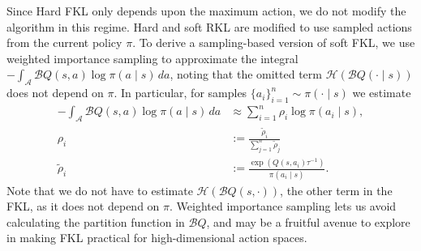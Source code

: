 \documentclass[twoside,11pt]{article}
\newcommand{\actionspace}{\mathcal{A}}
\newcommand{\boltzmannQ}{\mathcal{B}Q}
\newcommand{\entropy}{\mathcal{H}}
\begin{document}
Since Hard FKL only depends upon the maximum action, we do not modify the algorithm in this regime. Hard and soft RKL are modified to use sampled actions from the current policy $\pi$. To derive a sampling-based version of soft FKL, we use weighted importance sampling to approximate the integral $-\int_\actionspace \boltzmannQ(s, a) \log \pi(a \mid s)\, da$, noting that the omitted term $\entropy(\boltzmannQ(\cdot \mid s))$ does not depend on $\pi$. In particular, for samples $\{a_i\}_{i = 1}^n \sim \pi(\cdot \mid s)$ we estimate 
\begin{align*}
    -\int_\actionspace \boltzmannQ(s, a) \log \pi(a \mid s)\, da &\approx \sum_{i = 1}^n \rho_i \log \pi(a_i \mid s) ,\\
    \rho_i &:= \frac{\tilde{\rho}_i}{\sum_{j = 1}^n \tilde{\rho}_j}\\
    \tilde{\rho}_i &:= \frac{\exp(Q(s, a_i) \tau^{-1})}{\pi(a_i \mid s)}. 
\end{align*}
Note that we do not have to estimate $\entropy(\boltzmannQ(s, \cdot))$, the other term in the FKL, as it does not depend on $\pi$. Weighted importance sampling lets us avoid calculating the partition function in $\boltzmannQ$, and may be a fruitful avenue to explore in making FKL practical for high-dimensional action spaces. 

  
\end{document}
